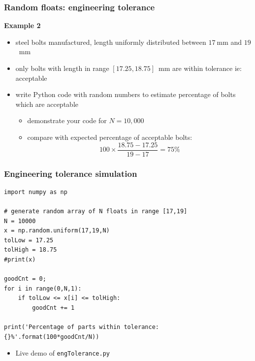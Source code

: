 \documentclass[english,14pt]{beamer}
\begin{document}

\begin{frame}[fragile]

\frametitle{Random floats: engineering tolerance}

\textbf{Example 2}\\
\vspace*{2mm}
\begin{itemize}
	\item steel bolts manufactured, length uniformly distributed between $17~$mm and $19$~mm
	\item only bolts with length in range $[17.25,18.75]$~mm are within tolerance ie: acceptable
	\item write Python code with random numbers to estimate percentage of bolts which are acceptable
	\begin{itemize}
		\item demonstrate your code for $N=10,000$
		\item compare with expected percentage of acceptable bolts:
		\[
			100 \times \frac{18.75-17.25}{19-17} = 75\%
		\]
	\end{itemize}
\end{itemize}

\end{frame}


\begin{frame}[fragile]

\frametitle{Engineering tolerance simulation}
\vspace*{-3mm}
\begin{lstlisting}[style=CStyle]
import numpy as np

# generate random array of N floats in range [17,19]
N = 10000
x = np.random.uniform(17,19,N)
tolLow = 17.25
tolHigh = 18.75
#print(x)

goodCnt = 0;
for i in range(0,N,1):
    if tolLow <= x[i] <= tolHigh:
        goodCnt += 1

print('Percentage of parts within tolerance: {}%'.format(100*goodCnt/N))
\end{lstlisting}
\vspace*{-3mm}
\begin{itemize}
	\item Live demo of \texttt{engTolerance.py}
\end{itemize}
\end{frame}
\end{document}
